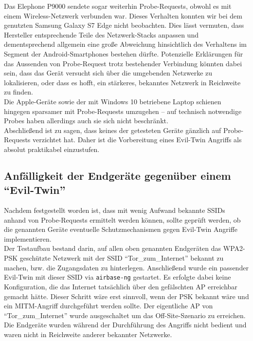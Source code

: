 Das Elephone P9000 sendete sogar weiterhin Probe-Requests, obwohl es mit einem Wireless-Netzwerk verbunden war. Dieses Verhalten konnten wir bei dem genutzten Samsung Galaxy S7 Edge nicht beobachten. Dies lässt vermuten, dass Hersteller entsprechende Teile des Netzwerk-Stacks anpassen und dementsprechend allgemein eine große Abweichung hinsichtlich des Verhaltens im Segment der Android-Smartphones bestehen dürfte.
Potenzielle Erklärungen für das Aussenden von Probe-Request trotz bestehender Verbindung könnten dabei sein, dass das Gerät versucht sich über die umgebenden Netzwerke zu lokalisieren, oder dass es hofft, ein stärkeres, bekanntes Netzwerk in Reichweite zu finden.\\

Die Apple-Geräte sowie der mit Windows 10 betriebene Laptop schienen hingegen sparsamer mit Probe-Requests umzugehen -- auf technisch notwendige Probes haben allerdings auch sie sich nicht beschränkt.\\

Abschließend ist zu sagen, dass keines der getesteten Geräte gänzlich auf Probe-Requests verzichtet hat.
Daher ist die Vorbereitung eines Evil-Twin Angriffs als absolut praktikabel einzustufen.

\subsection{Anfälligkeit der Endgeräte gegenüber einem \enquote{Evil-Twin}}
Nachdem festgestellt worden ist, dass mit wenig Aufwand bekannte SSIDs anhand von Probe-Requests ermittelt werden können, sollte geprüft werden, ob die genannten Geräte eventuelle Schutzmechanismen gegen Evil-Twin Angriffe implementieren.\\

Der Testaufbau bestand darin, auf allen oben genannten Endgeräten das WPA2-PSK geschützte Netzwerk mit der SSID \enquote{Tor\_zum\_Internet} bekannt zu machen, bzw. die Zugangsdaten zu hinterlegen.
Anschließend wurde ein passender Evil-Twin mit dieser SSID via \texttt{airbase-ng} gestartet. Es erfolgte dabei keine Konfiguration, die das Internet tatsächlich über den gefälschten AP erreichbar gemacht hätte. Dieser Schritt wäre erst sinnvoll, wenn der PSK bekannt wäre und ein MITM-Angriff durchgeführt werden sollte. Der eigentliche AP von \enquote{Tor\_zum\_Internet} wurde ausgeschaltet um das Off-Site-Szenario zu erreichen.
Die Endgeräte wurden während der Durchführung des Angriffs nicht bedient und waren nicht in Reichweite anderer bekannter Netzwerke.

